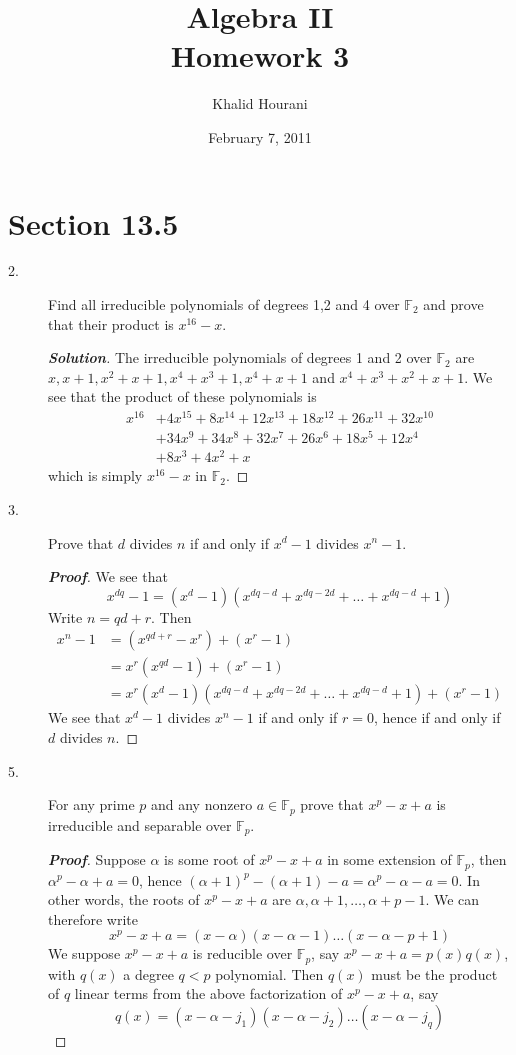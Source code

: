 \documentclass[12pt,leqno]{book}
\title{Algebra II\\\large Homework 3}
\date{February 7, 2011}
\author{Khalid Hourani}
\theoremstyle{definition}
\newcommand{\F}{\mathbb{F}}
\newenvironment{Proof}{\begin{proof}[\textnormal{\textbf{Proof}}]}{\end{proof}}
\newenvironment{Solution}{\begin{proof}[\textnormal{\textbf{Solution}}]}{\end{proof}}
\begin{document}
 \begin{titlepage}
  \maketitle
 \end{titlepage}

\section*{Section 13.5}
  \begin{description}
   \item [2.] Find all irreducible polynomials of degrees 1,2 and 4 over $\F_2$ and prove that their product is $x^{16}-x$.
    \begin{Solution}
     The irreducible polynomials of degrees 1 and 2 over $\F_2$ are $x,x+1,x^2+x+1,x^4+x^3+1,x^4+x+1$ and $x^4+x^3+x^2+x+1$. We see that the product of these polynomials is \begin{align*}x^{16}&+4x^{15}+8x^{14}+12x^{13}+18x^{12}+26x^{11}+32x^{10}\\&+34x^9+34x^8+32x^7+26x^6+18x^5+12x^4\\&+8x^3+4x^2+x\end{align*} which is simply $x^{16}-x$ in $\F_2$.
    \end{Solution}
   \item [3.] Prove that $d$ divides $n$ if and only if $x^d-1$ divides $x^n-1$.
    \begin{Proof}
     We see that \[x^{dq}-1=(x^d-1)(x^{dq-d}+x^{dq-2d}+\hdots+x^{dq-d}+1)\] Write $n=qd+r$. Then \begin{align*}x^n-1&=(x^{qd+r}-x^r)+(x^r-1)\\&=x^r(x^{qd}-1)+(x^r-1)\\&=x^r(x^d-1)(x^{dq-d}+x^{dq-2d}+\hdots+x^{dq-d}+1)+(x^r-1)\end{align*} We see that $x^d-1$ divides $x^n-1$ if and only if $r=0$, hence if and only if $d$ divides $n$.
    \end{Proof}
   \item [5.] For any prime $p$ and any nonzero $a\in\F_p$ prove that $x^p-x+a$ is irreducible and separable over $\F_p$.
    \begin{Proof}
     Suppose $\alpha$ is some root of $x^p-x+a$ in some extension of $\F_p$, then $\alpha^p-\alpha+a=0$, hence $(\alpha+1)^p-(\alpha+1)-a=\alpha^p-\alpha-a=0$. In other words, the roots of $x^p-x+a$ are $\alpha,\alpha+1,\hdots,\alpha+p-1$. We can therefore write \[x^p-x+a=(x-\alpha)(x-\alpha-1)\hdots(x-\alpha-p+1)\] We suppose $x^p-x+a$ is reducible over $\F_p$, say $x^p-x+a=p(x)q(x)$, with $q(x)$ a degree $q<p$ polynomial. Then $q(x)$ must be the product of $q$ linear terms from the above factorization of $x^p-x+a$, say \[q(x)=(x-\alpha-j_1)(x-\alpha-j_2)\hdots(x-\alpha-j_q)\]

\end{Proof}
\end{description}
\end{document}
